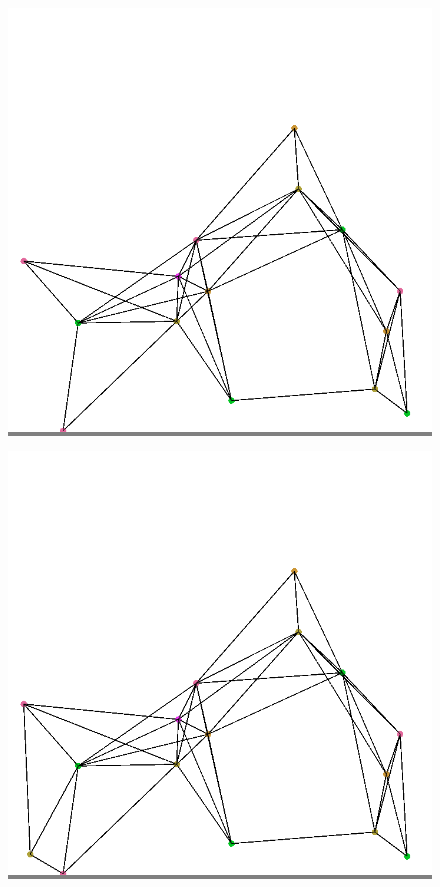 \documentclass{article}
\begin{document}
\begin{figure}
\begin{minipage}{0.2\textwidth}
            \end{minipage}
            \hspace{\fill}
            \begin{minipage}{0.2\textwidth}
            \colorbox{gray}{\includegraphics[width=\linewidth]{./images/color-15.png}}
            \end{minipage}
            \hspace{\fill}
            \begin{minipage}{0.2\textwidth}
            \colorbox{gray}{\includegraphics[width=\linewidth]{./images/color-16.png}}

\end{minipage}
\end{figure}
\end{document}
